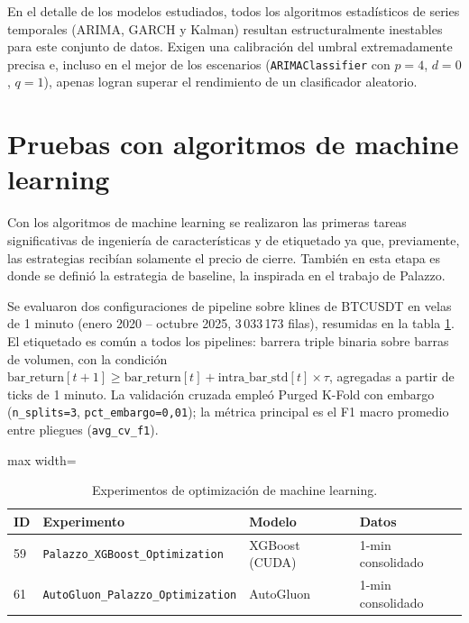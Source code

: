 En el detalle de los modelos estudiados, todos los algoritmos estadísticos de series temporales (ARIMA, GARCH y Kalman) resultan estructuralmente inestables para este conjunto de datos. Exigen una calibración del umbral extremadamente precisa e, incluso en el mejor de los escenarios (\texttt{ARIMAClassifier} con $p=4$, $d=0$, $q=1$), apenas logran superar el rendimiento de un clasificador aleatorio.

\section{Pruebas con algoritmos de machine learning}

Con los algoritmos de machine learning se realizaron las primeras tareas significativas de ingeniería de características y de etiquetado  ya que, previamente, las estrategias recibían solamente el precio de cierre. También en esta etapa es donde se definió la estrategia de baseline, la inspirada en el trabajo de Palazzo.

Se evaluaron dos configuraciones de pipeline sobre klines de BTCUSDT en velas de 1 minuto (enero 2020 -- octubre 2025, 3\,033\,173 filas), resumidas en la tabla \ref{tab:ml_experiments}. El etiquetado es común a todos los pipelines: barrera triple binaria sobre barras de volumen, con la condición $\text{bar\_return}[t+1] \geq \text{bar\_return}[t] + \text{intra\_bar\_std}[t] \times \tau$, agregadas a partir de ticks de 1 minuto. La validación cruzada empleó Purged K-Fold con embargo (\texttt{n\_splits=3}, \texttt{pct\_embargo=0,01}); la métrica principal es el F1 macro promedio entre pliegues (\texttt{avg\_cv\_f1}).

\begin{table}[H]
    \centering
    \caption[Experimentos de optimización ML]{Experimentos de optimización de machine learning.}
    \small
    \begin{adjustbox}{max width=\textwidth}
    \begin{tabular}{l l l l}
        \toprule
        \textbf{ID} & \textbf{Experimento} & \textbf{Modelo} & \textbf{Datos} \\
        \midrule
        59 & \texttt{Palazzo\_XGBoost\_Optimization}    & XGBoost (CUDA) & 1-min consolidado \\
        61 & \texttt{AutoGluon\_Palazzo\_Optimization}  & AutoGluon      & 1-min consolidado \\
        \bottomrule
    \end{tabular}
    \end{adjustbox}
    \label{tab:ml_experiments}
\end{table}

